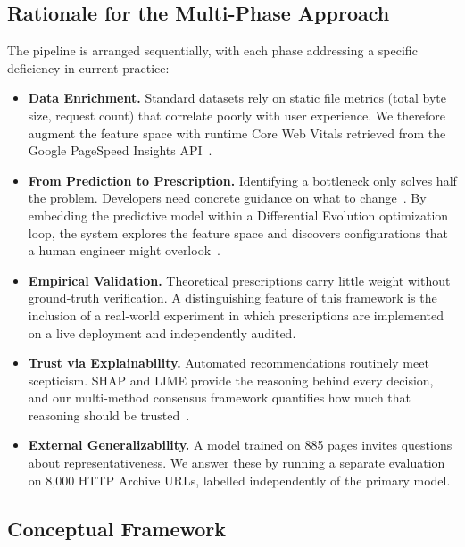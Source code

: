 \documentclass[sn-nature]{sn-jnl}
\begin{document}
\subsection{Rationale for the Multi-Phase Approach}

The pipeline is arranged sequentially, with each phase addressing a specific deficiency in current practice:

\begin{itemize}
    \item \textbf{Data Enrichment.} Standard datasets rely on static file metrics (total byte size, request count) that correlate poorly with user experience. We therefore augment the feature space with runtime Core Web Vitals retrieved from the Google PageSpeed Insights API~\cite{mathur2024}.

    \item \textbf{From Prediction to Prescription.} Identifying a bottleneck only solves half the problem. Developers need concrete guidance on what to change~\cite{vanriet2023}. By embedding the predictive model within a Differential Evolution optimization loop, the system explores the feature space and discovers configurations that a human engineer might overlook~\cite{notz2024, surianarayanan2023}.

    \item \textbf{Empirical Validation.} Theoretical prescriptions carry little weight without ground-truth verification. A distinguishing feature of this framework is the inclusion of a real-world experiment in which prescriptions are implemented on a live deployment and independently audited.

    \item \textbf{Trust via Explainability.} Automated recommendations routinely meet scepticism. SHAP and LIME provide the reasoning behind every decision, and our multi-method consensus framework quantifies how much that reasoning should be trusted~\cite{hassija2024, bennetot2024}.

    \item \textbf{External Generalizability.} A model trained on 885 pages invites questions about representativeness. We answer these by running a separate evaluation on 8,000 HTTP Archive URLs, labelled independently of the primary model.
\end{itemize}

\subsection{Conceptual Framework}
\end{document}
